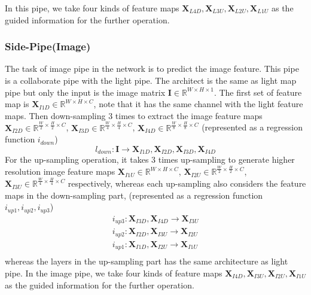 In this pipe, we take four kinds of feature maps $ \textbf{X}_{L4D}, \textbf{X}_{L3U},\textbf{X}_{L2U}, \textbf{X}_{L1U} $ as the guided information for the further operation.


\subsubsection{Side-Pipe(Image)}
The task of image pipe in the network is to predict the image feature. This pipe is a collaborate pipe with the light pipe. The architect is the same as light map pipe but only the input is the image matrix $ \textbf{I}\in  \mathbb{R}^{W\times H\times 1}$. The first set of feature map is $ \textbf{X}_{I1D} \in \mathbb{R}^{{W}\times H\times C} $, note that it has the same channel with the light feature maps. Then down-sampling 3 times to extract the image feature maps
$ \textbf{X}_{I2D} \in \mathbb{R}^{\frac{W}{2}\times \frac{H}{2}\times C} $,
$ \textbf{X}_{I3D} \in \mathbb{R}^{\frac{W}{4}\times \frac{H}{4}\times C} $,
$ \textbf{X}_{I4D} \in \mathbb{R}^{\frac{W}{8}\times \frac{H}{8}\times C} $
(represented as a regression function $ i_{down} $)
\[ l_{down}: \textbf{I} \rightarrow  \textbf{X}_{I1D} , \textbf{X}_{I2D}, \textbf{X}_{I3D}, \textbf{X}_{I4D} \]
For the up-sampling operation, it takes 3 times up-sampling to generate higher resolution image feature maps
$ \textbf{X}_{I1U} \in \mathbb{R}^{{W}\times {H}\times C} $,
$ \textbf{X}_{I2U} \in \mathbb{R}^{\frac{W}{2}\times \frac{H}{2}\times C} $,
$ \textbf{X}_{I3U} \in \mathbb{R}^{\frac{W}{4}\times \frac{H}{4}\times C} $ respectively, whereas each up-sampling also considers the feature maps in the down-sampling part,
(represented as a regression function $ i_{up1}, i_{up2}, i_{up3} $)
\[ 
\begin{matrix}
	i_{up3} : \textbf{X}_{I3D}, \textbf{X}_{I4D} \rightarrow \textbf{X}_{I3U} \\
	i_{up2} : \textbf{X}_{I2D}, \textbf{X}_{I3U} \rightarrow \textbf{X}_{I2U} \\
	i_{up1} : \textbf{X}_{I1D}, \textbf{X}_{I2U} \rightarrow \textbf{X}_{I1U} \\
\end{matrix}
\]
whereas the layers in the up-sampling part has the same architecture as light pipe. In the image pipe, we take four kinds of feature maps $ \textbf{X}_{I4D}, \textbf{X}_{I3U},\textbf{X}_{I2U}, \textbf{X}_{I1U} $ as the guided information for the further operation.

